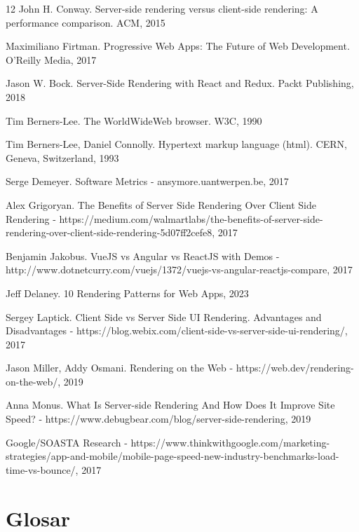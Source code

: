 \documentclass[12pt, a4paper]{report}
\begin{document}
\begin{thebibliography} {12}
	 John H. Conway. Server-side rendering versus client-side rendering: A performance comparison. ACM, 2015

	 Maximiliano Firtman. Progressive Web Apps: The Future of Web Development. O'Reilly Media, 2017

	 Jason W. Bock. Server-Side Rendering with React and Redux. Packt Publishing, 2018

	 Tim Berners-Lee. The WorldWideWeb browser. W3C, 1990

	 Tim Berners-Lee, Daniel Connolly. Hypertext markup language (html). CERN, Geneva, Switzerland, 1993

	 Serge Demeyer. Software Metrics - ansymore.uantwerpen.be, 2017

	 Alex Grigoryan. The Benefits of Server Side Rendering Over Client Side Rendering - https://medium.com/walmartlabs/the-benefits-of-server-side-rendering-over-client-side-rendering-5d07ff2cefe8, 2017

	 Benjamin Jakobus. VueJS vs Angular vs ReactJS with Demos - http://www.dotnetcurry.com/vuejs/1372/vuejs-vs-angular-reactjs-compare, 2017

	 Jeff Delaney. 10 Rendering Patterns for Web Apps, 2023

	 Sergey Laptick. Client Side vs Server Side UI Rendering. Advantages and Disadvantages - https://blog.webix.com/client-side-vs-server-side-ui-rendering/, 2017

	 Jason Miller, Addy Osmani. Rendering on the Web - https://web.dev/rendering-on-the-web/, 2019

	 Anna Monus. What Is Server-side Rendering And How Does It Improve Site Speed?
	- https://www.debugbear.com/blog/server-side-rendering, 2019

	 Google/SOASTA Research - https://www.thinkwithgoogle.com/marketing-strategies/app-and-mobile/mobile-page-speed-new-industry-benchmarks-load-time-vs-bounce/, 2017

\end{thebibliography}


\appendix %

\chapter{Glosar}
\end{document}
